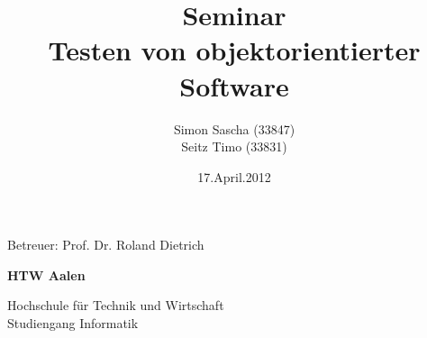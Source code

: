 \documentclass[a4paper,12pt]{article}
\title{
\textbf{Seminar} \\
\vspace{20 mm}
Testen von objektorientierter Software \\
\vspace{20 mm}
}
\author{Simon Sascha (33847) \\
 Seitz Timo (33831)}
\date{17.April.2012}
\begin{document}
\setcounter{page}{0}

\maketitle\thispagestyle{empty}
\vspace{10 mm}
\center Betreuer: Prof. Dr. Roland Dietrich \\
\vspace{50mm}

{\centering\bfseries
HTW Aalen
\par}

{\centering
Hochschule für Technik und Wirtschaft \\
Studiengang Informatik
\par}
\clearpage

\tableofcontents

\section{}
\end{document}
